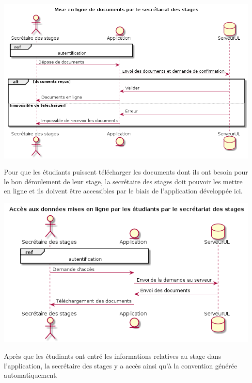 \documentclass{scrreprt}
\begin{document}
\begin{center}
	\includegraphics[scale=0.55]{image/miseEnLigneDocumentsParSecretaire.png}
\end{center}
\hspace{1cm}Pour que les étudiants puissent télécharger les documents dont ils ont besoin pour le bon déroulement de leur stage, la secrétaire des stages doit pouvoir les mettre en ligne et ils doivent être accessibles par le biais de l'application développée ici.

\begin{center}
	\includegraphics[scale=0.55]{image/accesDonneesParSecretaire.png}
\end{center}
\hspace{1cm}Après que les étudiants ont entré les informations relatives au stage dans l'application, la secrétaire des stages y a accès ainsi qu'à la convention générée automatiquement.
\end{document}
